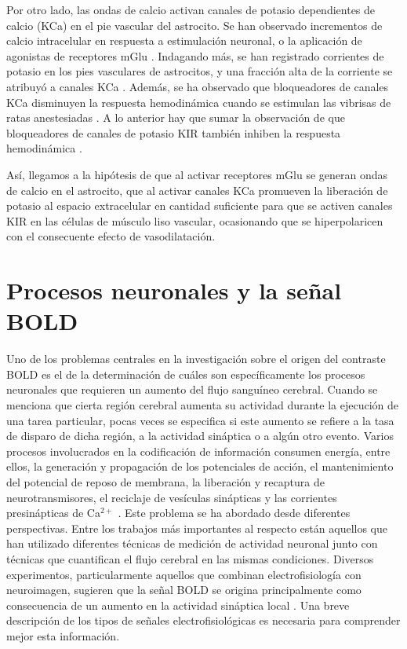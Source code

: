 Por otro lado, las ondas de calcio activan canales de potasio dependientes de calcio (KCa) en el pie vascular del astrocito. Se han observado incrementos de calcio intracelular en respuesta a estimulación neuronal, o la aplicación de agonistas de receptores mGlu \cite{FilosaJA2004}. Indagando más, se han registrado corrientes de potasio en los pies vasculares de astrocitos, y una fracción alta de la corriente se atribuyó a canales KCa \cite{FilosaJA2006}. Además, se ha observado que bloqueadores de canales KCa disminuyen la respuesta hemodinámica cuando se estimulan las vibrisas de ratas anestesiadas \cite{GerritsRJ2002}. A lo anterior hay que sumar la observación de que bloqueadores de canales de potasio KIR también inhiben la respuesta hemodinámica \cite{FilosaJA2004}.

Así, llegamos a la hipótesis de que al activar receptores mGlu se generan ondas de calcio en el astrocito, que al activar canales KCa  promueven la liberación de potasio al espacio extracelular en cantidad suficiente para que se activen canales KIR  en las células de músculo liso vascular, ocasionando que se hiperpolaricen con el consecuente efecto de vasodilatación.

\section{Procesos neuronales y la señal BOLD}
Uno de los problemas centrales en la investigación sobre el origen del contraste BOLD es el de la determinación de cuáles son específicamente los procesos neuronales que requieren un aumento del flujo sanguíneo cerebral. Cuando se menciona que cierta región cerebral aumenta su actividad durante la ejecución de una tarea particular, pocas veces se especifica si este aumento se refiere a la tasa de disparo de dicha región, a la actividad sináptica o a algún otro evento. Varios procesos involucrados en la codificación de información consumen energía, entre ellos, la generación y propagación de los potenciales de acción, el mantenimiento del potencial de reposo de membrana, la liberación y recaptura de neurotransmisores, el reciclaje de vesículas sinápticas y las corrientes presinápticas de Ca$^{2+}$ \cite{SmithAJ2002}. Este problema se ha abordado desde diferentes perspectivas. Entre los trabajos más importantes al respecto están aquellos que han utilizado diferentes técnicas de medición de actividad neuronal junto con técnicas que cuantifican el flujo cerebral en las mismas condiciones. Diversos experimentos, particularmente aquellos que combinan electrofisiología con neuroimagen, sugieren que la señal BOLD se origina principalmente como consecuencia de un aumento en la actividad sináptica local \cite{NK2003,NK2008,LogothetisNK2004}. Una breve descripción de los tipos de señales electrofisiológicas es necesaria para comprender mejor esta información.

